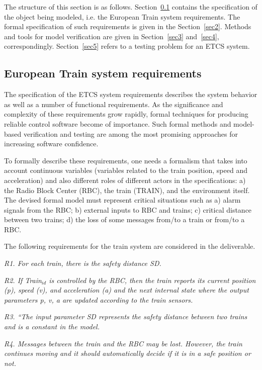 \documentclass{template/openetcs_article}
\begin{document}
The structure of this section is as follows. Section~\ref{sec1} contains the specification of the object being modeled, i.e. the European Train system requirements. The formal specification of such requirements is given in the Section~\ref{sec2}. Methods and tools for model verification are given in Section~\ref{sec3} and~\ref{sec4}, correspondingly. Section~\ref{sec5} refers to a testing problem for an ETCS system.  

\subsection{European Train system requirements}\label{sec1}

The specification of the ETCS system requirements describes the system behavior as well as a number of functional requirements. As the significance and complexity of these requirements grow rapidly, formal techniques for producing reliable control software become of importance. Such formal methods and model-based verification and testing are among the most promising approaches for increasing software confidence.

To formally describe these requirements, one needs a formalism that takes into account continuous variables (variables related to the train position, speed and acceleration) and also different roles of different actors in the specifications: a) the Radio Block Center (RBC), the train (TRAIN), and the environment itself. The devised formal model must represent critical situations such as a) alarm signals from the RBC; b) external inputs to RBC and trains; c) critical distance between two trains; d) the loss of some messages from/to a train or from/to a RBC.  

The following requirements for the train system are considered in the deliverable.

\textit{R1. For each train, there is the safety distance SD.}

\textit{R2. If Train$_{id}$ is controlled by the RBC, then the train reports its current position (p), speed (v), and acceleration (a) and the next internal state where the output parameters p, v, a are updated according to the train sensors.}

\textit{R3. “The input parameter SD represents the safety distance between two trains and is a constant in the model.}

\textit{R4. Messages between the train and the RBC may be lost. However, the train continues moving and it should automatically decide if it is in a safe position or not.}
\end{document}
